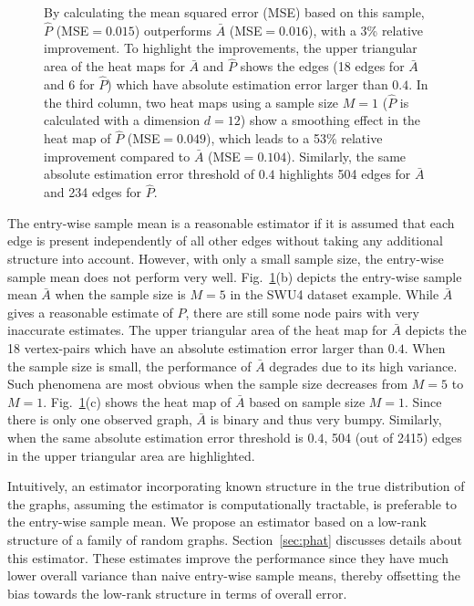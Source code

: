 \documentclass[journal,twoside,web]{ieeecolor}
\begin{document}
\begin{figure}[!tbp]
{%
By calculating the mean squared error (MSE) based on this sample,  $\hat{P}$ (MSE$=0.015$) outperforms $\bar{A}$ (MSE$=0.016$), with a 3\% relative improvement.
To highlight the improvements, the upper triangular area of the heat maps for $\bar{A}$ and $\hat{P}$ shows the edges (18 edges  for $\bar{A}$ and 6 for $\hat{P}$) which have absolute estimation error larger than $0.4$.
In the third column, two heat maps using a sample size $M = 1$  ($\hat{P}$ is calculated with a dimension $d = 12$) show a smoothing effect  in the heat map of $\hat{P}$ (MSE$=0.049$), which leads to a 53\% relative improvement compared to $\bar{A}$ (MSE$=0.104$). Similarly, the same absolute estimation error threshold of $0.4$ highlights 504 edges for $\bar{A}$ and 234 edges for $\hat{P}$.}


\label{fig:Matrix_desikan_m5}
\end{figure}


The entry-wise sample mean is a reasonable estimator if it is assumed that each edge is present independently of all other edges without taking any additional structure into account.
However, with only a small sample size, the entry-wise sample mean does not perform very well. Fig.~\ref{fig:Matrix_desikan_m5}(b) depicts the entry-wise sample mean $\bar{A}$ when the sample size is $M=5$ in the SWU4 dataset example.
While $\bar{A}$ gives a reasonable estimate of $P$, there are still some
node pairs with very inaccurate estimates.  The upper triangular area of the heat map for $\bar{A}$ depicts the 18 vertex-pairs which have an absolute estimation error larger than $0.4$.
When the sample size is small, the performance of $\bar{A}$ degrades due to its high variance. Such phenomena are most obvious when the sample size decreases from $M = 5$ to $M = 1$.
Fig.~\ref{fig:Matrix_desikan_m5}(c) shows the heat map of $\bar{A}$ based on sample size $M = 1$.
Since there is only one observed graph, $\bar{A}$ is binary and thus very bumpy.
Similarly, when the same absolute estimation error threshold is $0.4$, 504 (out of 2415) edges in the upper triangular area are highlighted.

Intuitively, an estimator incorporating known structure in the true distribution of the graphs, assuming the estimator is computationally tractable, is preferable to the entry-wise sample mean.
We propose an estimator based on a low-rank structure of a family of random graphs.
Section~\ref{sec:phat} discusses details about this estimator.
These estimates improve the performance since they have much lower overall variance than naive entry-wise sample means, thereby offsetting the bias towards the low-rank structure in terms of overall error.
\end{document}
